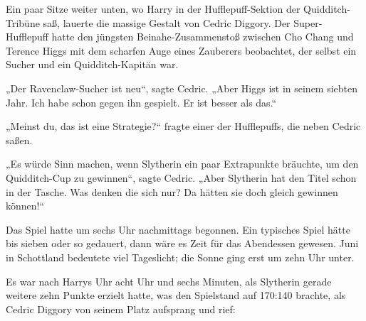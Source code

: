 Ein paar Sitze weiter unten, wo Harry in der Hufflepuff-Sektion der Quidditch-Tribüne saß, lauerte die massige Gestalt von Cedric Diggory. Der Super-Hufflepuff hatte den jüngsten Beinahe-Zusammenstoß zwischen Cho Chang und Terence Higgs mit dem scharfen Auge eines Zauberers beobachtet, der selbst ein Sucher und ein Quidditch-Kapitän war.

„Der Ravenclaw-Sucher ist neu“, sagte Cedric.
„Aber Higgs ist in seinem siebten Jahr. Ich habe schon gegen ihn gespielt. Er ist besser als das.“

„Meinst du, das ist eine Strategie?“ fragte einer der Hufflepuffs, die neben Cedric saßen.

„Es würde Sinn machen, wenn Slytherin ein paar Extrapunkte bräuchte, um den Quidditch-Cup zu gewinnen“, sagte Cedric.
„Aber Slytherin hat den Titel schon in der Tasche. Was denken die sich nur? Da hätten sie doch gleich gewinnen können!“

Das Spiel hatte um sechs Uhr nachmittags begonnen. Ein typisches Spiel hätte bis sieben oder so gedauert, dann wäre es Zeit für das Abendessen gewesen. Juni in Schottland bedeutete viel Tageslicht; die Sonne ging erst um zehn Uhr unter.

Es war nach Harrys Uhr acht Uhr und sechs Minuten, als Slytherin gerade weitere zehn Punkte erzielt hatte, was den Spielstand auf 170:140 brachte, als Cedric Diggory von seinem Platz aufsprang und rief:

